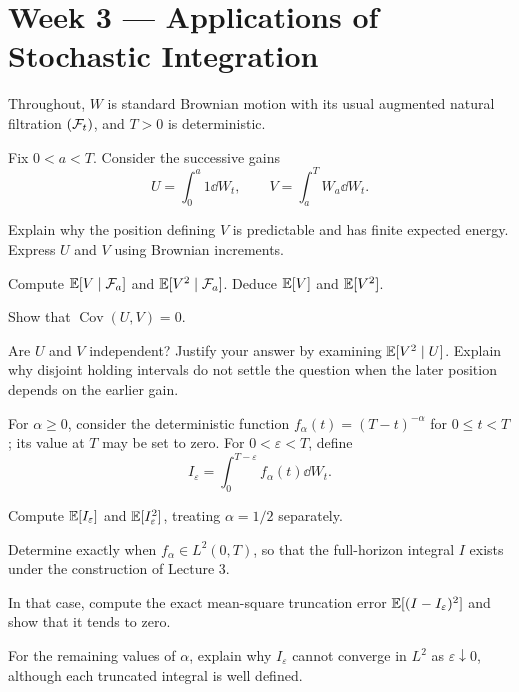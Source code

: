\section{Week 3 --- Applications of Stochastic Integration}

Throughout, \(W\) is standard Brownian motion with its usual augmented
natural filtration \((\mathcal F_t)\), and \(T>0\) is deterministic.

\ifIncludeCore

\setcounter{exercise}{0}
\begin{exercise}
Fix \(0<a<T\). Consider the successive gains
\[
U=\int_0^a 1\dd W_t,
\qquad
V=\int_a^T W_a\dd W_t.
\]
\begin{exparts}
  \item Explain why the position defining \(V\) is predictable and has
  finite expected energy. Express \(U\) and \(V\) using Brownian increments.
  \item Compute \(\mathbb E[V\mid\mathcal F_a]\) and \(\mathbb E[V^2\mid\mathcal F_a]\).
  Deduce \(\mathbb E[V]\) and \(\mathbb E[V^2]\).
  \item Show that \(\operatorname{Cov}(U,V)=0\).
  \item Are \(U\) and \(V\) independent? Justify your answer by examining
  \(\mathbb E[V^2\mid U]\). Explain why disjoint holding intervals do not settle
  the question when the later position depends on the earlier gain.
\end{exparts}
\end{exercise}

\begin{exercise}
For \(\alpha\geq0\), consider the deterministic function
\(f_\alpha(t)=(T-t)^{-\alpha}\) for \(0\leq t<T\); its value at
\(T\) may be set to zero. For \(0<\varepsilon<T\), define
\[
I_\varepsilon=\int_0^{T-\varepsilon}f_\alpha(t)\dd W_t.
\]
\begin{exparts}
  \item Compute \(\mathbb E[I_\varepsilon]\) and
  \(\mathbb E[I_\varepsilon^2]\), treating \(\alpha=1/2\) separately.
  \item Determine exactly when \(f_\alpha\in L^2(0,T)\), so that the
  full-horizon integral \(I\) exists under the construction of Lecture 3.
  \item In that case, compute the exact mean-square truncation error
  \(\mathbb E[(I-I_\varepsilon)^2]\) and show that it tends to zero.
  \item For the remaining values of \(\alpha\), explain why
  \(I_\varepsilon\) cannot converge in \(L^2\) as
  \(\varepsilon\downarrow0\), although each truncated integral is well defined.
\end{exparts}
\end{exercise}

